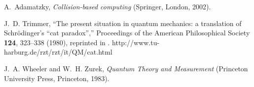 \documentclass[pra,amsfonts,twocolumn]{revtex4}
\begin{document}
\begin{thebibliography}{10}
A.~Adamatzky, {\em Collision-based computing\/} (Springer, London, 2002).

J.~D. Trimmer, \enquote{The present situation in quantum mechanics: a
  translation of {S}chr{\"{o}}dinger's ``cat paradox'',} Proceedings of the
  American Philosophical Society {\bf 124}, 323--338 (1980), reprinted in
  \cite[pp. 152-167]{wheeler-Zurek:83}.
\newline http://www.tu-harburg.de/rzt/rzt/it/QM/cat.html

J.~A. Wheeler and W.~H. Zurek, {\em Quantum Theory and Measurement\/}
  (Princeton University Press, Princeton, 1983).

\end{thebibliography}
\end{document}
